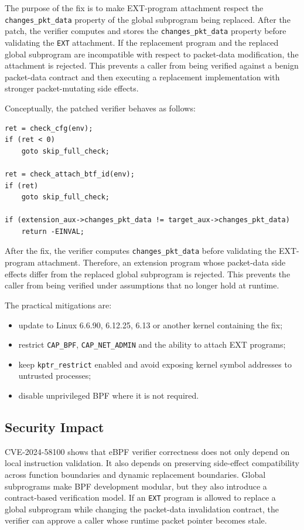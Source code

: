 \documentclass[../main.tex]{subfiles}
\begin{document}
The purpose of the fix is to make EXT-program attachment respect the \texttt{changes\_pkt\_data} property of the global subprogram being replaced. After the patch, the verifier computes and stores the \texttt{changes\_pkt\_data} property before validating the \texttt{EXT} attachment. If the replacement program and the replaced global subprogram are incompatible with respect to packet-data modification, the attachment is rejected. This prevents a caller from being verified against a benign packet-data contract and then executing a replacement implementation with stronger packet-mutating side effects.

Conceptually, the patched verifier behaves as follows:

\begin{lstlisting}[caption={Conceptual model of the fix.}]
ret = check_cfg(env);
if (ret < 0)
    goto skip_full_check;

ret = check_attach_btf_id(env);
if (ret)
    goto skip_full_check;

if (extension_aux->changes_pkt_data != target_aux->changes_pkt_data)
    return -EINVAL;
\end{lstlisting}

After the fix, the verifier computes \texttt{changes\_pkt\_data} before validating the EXT-program attachment. Therefore, an extension program whose packet-data side effects differ from the replaced global subprogram is rejected. This prevents the caller from being verified under assumptions that no longer hold at runtime.

The practical mitigations are:

\begin{itemize}
    \item update to Linux 6.6.90, 6.12.25, 6.13 or another kernel containing the fix;
    \item restrict \texttt{CAP\_BPF}, \texttt{CAP\_NET\_ADMIN} and the ability to attach EXT programs;
    \item keep \texttt{kptr\_restrict} enabled and avoid exposing kernel symbol addresses to untrusted processes;
    \item disable unprivileged BPF where it is not required.
\end{itemize}

\subsection{Security Impact}

CVE-2024-58100 shows that eBPF verifier correctness does not only depend on local instruction validation. It also depends on preserving side-effect compatibility across function boundaries and dynamic replacement boundaries. Global subprograms make BPF development modular, but they also introduce a contract-based verification model. If an \texttt{EXT} program is allowed to replace a global subprogram while changing the packet-data invalidation contract, the verifier can approve a caller whose runtime packet pointer becomes stale.
\end{document}
